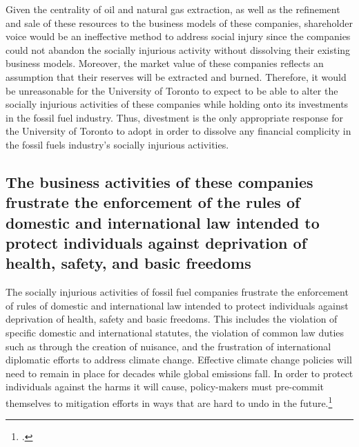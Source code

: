 Given the centrality of oil and natural gas extraction, as well as the refinement and sale of these resources to the business models of these companies, shareholder voice would be an ineffective method to address social injury since the companies could not abandon the socially injurious activity without dissolving their existing business models.  
Moreover, the market value of these companies reflects an assumption that their reserves will be extracted and burned.  
Therefore, it would be unreasonable for the University of Toronto to expect to be able to alter the socially injurious activities of these companies while holding onto its investments in the fossil fuel industry.  
Thus, divestment is the only appropriate response for the University of Toronto to adopt in order to dissolve any financial complicity in the fossil fuels industry’s socially injurious activities.  



	\subsection{The business activities of these companies frustrate the enforcement of the rules of domestic and international law intended to protect individuals against deprivation of health, safety, and basic freedoms}
	\label{sec:FrustrateLaw}



The socially injurious activities of fossil fuel companies frustrate the enforcement of rules of domestic and international law intended to protect individuals against deprivation of health, safety and basic freedoms.  
This includes the violation of specific domestic and international statutes, the violation of common law duties such as through the creation of nuisance, and the frustration of international diplomatic efforts to address climate change.
Effective climate change policies will need to remain in place for decades while global emissions fall.
In order to protect individuals against the harms it will cause, policy-makers must pre-commit themselves to mitigation efforts in ways that are hard to undo in the future.\footcite[In the \emph{Cornell Law Review}, Richard James Lazarus notes that: ``The traditional objection to lawmaking precommitment strategies --- that the present should not be allowed to bind future lawmakers --- also has little force in the climate change context where the purpose of such strategies is not to protect the present at the expense of the future, but the precise opposite: to protect the future at the expense of the present.''][p. 101]{Lazarus2009}



